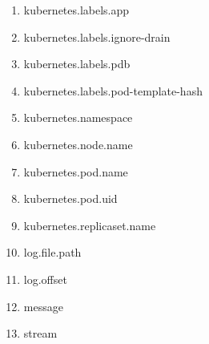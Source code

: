 \begin{enumerate}
\item kubernetes.labels.app
	
\item kubernetes.labels.ignore-drain
	
\item kubernetes.labels.pdb
	
\item kubernetes.labels.pod-template-hash
	
\item kubernetes.namespace
	
\item kubernetes.node.name
	
\item kubernetes.pod.name
	
\item kubernetes.pod.uid
	
\item kubernetes.replicaset.name
	
\item log.file.path

\item log.offset
	
\item message
	
\item stream

\end{enumerate}